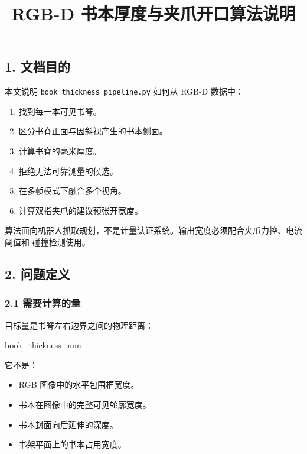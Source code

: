 \documentclass[
  chinese,
  11pt,
  a4paper,
]{article}
\title{RGB-D 书本厚度与夹爪开口算法说明}
\author{}
\date{}
\newenvironment{Shaded}{\begin{snugshade}}{\end{snugshade}}
\newcommand{\NormalTok}[1]{#1}
\providecommand{\tightlist}{%
  \setlength{\itemsep}{0pt}\setlength{\parskip}{0pt}}
\begin{document}
\maketitle

\renewcommand*\contentsname{目录}
{
\setcounter{tocdepth}{3}
\tableofcontents
}
\subsection{1. 文档目的}\label{1-ux6587ux6863ux76eeux7684}

本文说明 \texttt{book\_thickness\_pipeline.py} 如何从 RGB-D 数据中：

\begin{enumerate}
\def\labelenumi{\arabic{enumi}.}
\tightlist
\item
  找到每一本可见书脊。
\item
  区分书脊正面与因斜视产生的书本侧面。
\item
  计算书脊的毫米厚度。
\item
  拒绝无法可靠测量的候选。
\item
  在多帧模式下融合多个视角。
\item
  计算双指夹爪的建议预张开宽度。
\end{enumerate}

算法面向机器人抓取规划，不是计量认证系统。输出宽度必须配合夹爪力控、电流阈值和
碰撞检测使用。

\subsection{2. 问题定义}\label{2-ux95eeux9898ux5b9aux4e49}

\subsubsection{2.1
需要计算的量}\label{21-ux9700ux8981ux8ba1ux7b97ux7684ux91cf}

目标量是书脊左右边界之间的物理距离：

\begin{Shaded}
\begin{Highlighting}[]
\NormalTok{book\_thickness\_mm}
\end{Highlighting}
\end{Shaded}

它不是：

\begin{itemize}
\tightlist
\item
  RGB 图像中的水平包围框宽度。
\item
  书本在图像中的完整可见轮廓宽度。
\item
  书本封面向后延伸的深度。
\item
  书架平面上的书本占用宽度。
\end{itemize}
\end{document}
